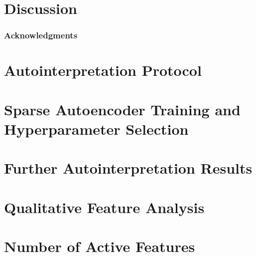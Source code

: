 \documentclass{article} %
\begin{document}



\section{Discussion}


\ificlrfinal
\subsubsection*{Acknowledgments}

\fi





\appendix

\section{Autointerpretation Protocol}
\label{appendix:autointerp_protocol}


\section{Sparse Autoencoder Training and Hyperparameter Selection}
\label{appendix:hparam_selection}


\section{Further Autointerpretation Results}
\label{appendix:full_autointerp}

\section{Qualitative Feature Analysis}
\label{appendix:feature_interp_examples}


\section{Number of Active Features}
\label{appendix:n_features_active}

\end{document}
